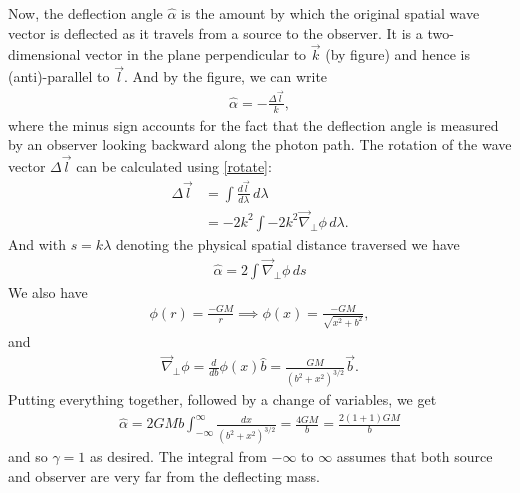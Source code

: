 \documentclass{book}
\theoremstyle{definition}
\newcommand{\nn}{\nonumber}
\newcommand{\f}[2]{\frac{#1}{#2}}
\begin{document}
Now, the deflection angle $\hat{\alpha}$ is the amount by which the original spatial wave vector is deflected as it travels from a source to the observer. It is a two-dimensional vector in the plane perpendicular to $\vec{k}$ (by figure) and hence is (anti)-parallel to $\vec{l}$. And by the figure, we can write
\begin{align}
\hat{\alpha} = -\f{\Delta \vec{l}}{k},
\end{align}
where the minus sign accounts for the fact that the deflection angle is measured by an observer looking backward along the photon path. The rotation of the wave vector $\Delta \vec{l}$ can be calculated using \eqref{rotate}:
\begin{align}
\Delta \vec{l} &= \int \f{d\vec{l}}{d\lambda}\,d\lambda \nn\\
&= -2k^2 \int -2k^2\vec{\nabla}_\perp \phi\,d\lambda.
\end{align}  
And with $s = k\lambda$ denoting the physical spatial distance traversed we have
\begin{align}
\boxed{\hat{\alpha} = 2\int \vec{\nabla}_\perp \phi\,ds}
\end{align}
We also have
\begin{align}
\phi(r) = \f{-GM}{r} \implies \phi(x) = \f{-GM}{\sqrt{x^2 + b^2}},
\end{align}
and
\begin{align}
\vec{\nabla}_\perp \phi = \f{d}{db}\phi(x)\hat{b} = \f{GM}{(b^2 + x^2)^{3/2}}\vec{b}.
\end{align}
Putting everything together, followed by a change of variables, we get
\begin{align}
\boxed{\hat{\alpha} = 2GMb\int_{-\infty}^\infty \f{dx}{(b^2 + x^2)^{3/2}} = \f{4GM}{b} = \f{2(1+1)GM}{b}}
\end{align}
and so $\gamma=1$ as desired. The integral from $-\infty$ to $\infty$ assumes that both source and observer are very far from the deflecting mass. \\
\end{document}
